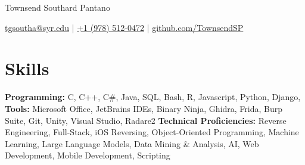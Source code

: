 
\vspace{-70pt}
\centerline{\huge Townsend Southard Pantano}

\vspace{-1pt}

\centerline{\href{mailto:tgsoutha@syr.edu}{tgsoutha@syr.edu} | \href{tel:+19785120472}{+1 (978) 512-0472} | \href{https://github.com/TownsendSP}{github.com/TownsendSP}}
\vspace{-13.5pt}
\section*{Skills}
	\textbf{Programming:} C, C++, C\#, Java, SQL, Bash, R, Javascript, Python, Django, 
\\
\textbf{Tools:} Microsoft Office, JetBrains IDEs, Binary Ninja, Ghidra, Frida, Burp Suite, Git, Unity, Visual Studio, Radare2
\textbf{Technical Proficiencies:} Reverse Engineering, Full-Stack, iOS Reversing, Object-Oriented Programming, Machine Learning, Large Language Models, Data Mining \& Analysis, AI, Web Development, Mobile Development, Scripting
\vspace{-17pt}

